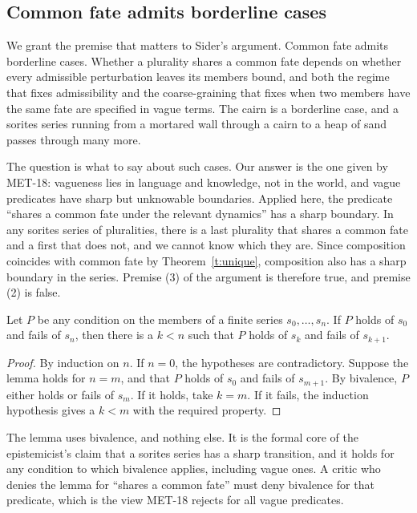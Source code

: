 \documentclass{situationist-preprint}
\begin{document}
\subsection{Common fate admits borderline cases}

We grant the premise that matters to Sider's argument. Common fate admits borderline cases. Whether a plurality shares a common fate depends on whether every admissible perturbation leaves its members bound, and both the regime that fixes admissibility and the coarse-graining that fixes when two members have the same fate are specified in vague terms. The cairn is a borderline case, and a sorites series running from a mortared wall through a cairn to a heap of sand passes through many more.

The question is what to say about such cases. Our answer is the one given by MET-18: vagueness lies in language and knowledge, not in the world, and vague predicates have sharp but unknowable boundaries. Applied here, the predicate \enquote{shares a common fate under the relevant dynamics} has a sharp boundary. In any sorites series of pluralities, there is a last plurality that shares a common fate and a first that does not, and we cannot know which they are. Since composition coincides with common fate by Theorem~\ref{t:unique}, composition also has a sharp boundary in the series. Premise (3) of the argument is therefore true, and premise (2) is false.

\begin{lemma}\label{l:sharp}
Let $P$ be any condition on the members of a finite series $s_0, \dots, s_n$. If $P$ holds of $s_0$ and fails of $s_n$, then there is a $k < n$ such that $P$ holds of $s_k$ and fails of $s_{k+1}$.
\end{lemma}

\begin{proof}
By induction on $n$. If $n = 0$, the hypotheses are contradictory. Suppose the lemma holds for $n = m$, and that $P$ holds of $s_0$ and fails of $s_{m+1}$. By bivalence, $P$ either holds or fails of $s_m$. If it holds, take $k = m$. If it fails, the induction hypothesis gives a $k < m$ with the required property.
\end{proof}

The lemma uses bivalence, and nothing else. It is the formal core of the epistemicist's claim that a sorites series has a sharp transition, and it holds for any condition to which bivalence applies, including vague ones. A critic who denies the lemma for \enquote{shares a common fate} must deny bivalence for that predicate, which is the view MET-18 rejects for all vague predicates.
\end{document}
